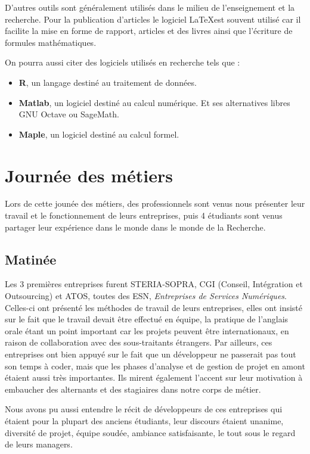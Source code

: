 \documentclass[14pt, a4paper]{report}
\begin{document}
  D'autres outils sont généralement utilisés dans le milieu de l'enseignement et la recherche. Pour la publication d'articles le logiciel \LaTeX est souvent utilisé car il facilite la mise en forme de rapport, articles et des livres ainsi que l'écriture de formules mathématiques.

  On pourra aussi citer des logiciels utilisés en recherche tels que :
  \begin{itemize}
  	\item \textbf{R}, un langage destiné au traitement de données.
  	\item \textbf{Matlab}, un logiciel destiné au calcul numérique. Et ses alternatives libres GNU Octave ou SageMath.
  	\item \textbf{Maple}, un logiciel destiné au calcul formel.
  \end{itemize}

\chapter{Journée des métiers}

Lors de cette jounée des métiers, des professionnels sont venus nous présenter leur travail et le fonctionnement de leurs entreprises, puis 4 étudiants sont venus partager leur expérience dans le monde dans le monde de la Recherche.

\section{Matinée}

Les 3 premières entreprises furent STERIA-SOPRA, CGI (Conseil, Intégration et Outsourcing) et ATOS, toutes des ESN, \emph{Entreprises de Services Numériques}. Celles-ci ont présenté les méthodes de travail de leurs entreprises, elles ont insisté sur le fait que le travail devait être effectué en équipe, la pratique de l'anglais orale étant un point important car les projets peuvent être internationaux, en raison de collaboration avec des sous-traitants étrangers. Par ailleurs, ces entreprises ont bien appuyé sur le fait que un développeur ne passerait pas tout son temps à coder, mais que les phases d'analyse et de gestion de projet en amont étaient aussi très importantes. Ils mirent également l'accent sur leur motivation à embaucher des alternants et des stagiaires dans notre corps de métier.

Nous avons pu aussi entendre le récit de développeurs de ces entreprises qui étaient pour la plupart des anciens étudiants, leur discours étaient unanime, diversité de projet, équipe soudée, ambiance satisfaisante, le tout sous le regard de leurs managers.
\end{document}
